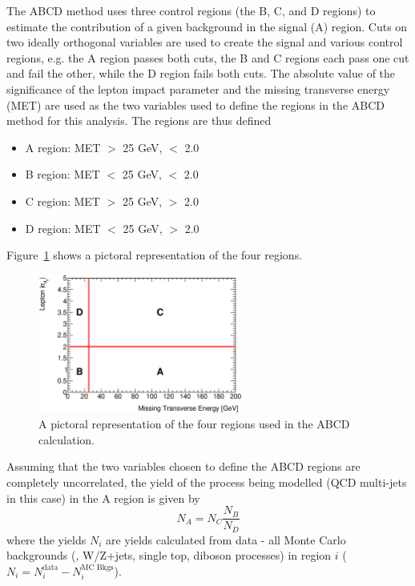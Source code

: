 The ABCD method uses three control regions (the B, C, and D regions) to estimate
the contribution of a given background in the signal (A) region. Cuts on two ideally
orthogonal variables are used to create the signal and various control regions, e.g. 
the A region passes both cuts, the B and C regions each pass one cut and fail the other, 
while the D region fails both cuts. The absolute value of the significance of the lepton 
impact parameter and the missing transverse energy (MET) are used as the two variables 
used to define the regions in the ABCD method for this analysis. The regions are thus 
defined 
\begin{itemize}
\item A region: MET $>$ 25 GeV, \dsig $<$ 2.0
\item B region: MET $<$ 25 GeV, \dsig $<$ 2.0
\item C region: MET $>$ 25 GeV, \dsig $>$ 2.0
\item D region: MET $<$ 25 GeV, \dsig $>$ 2.0
\end{itemize}
Figure~\ref{fig:abcdCartoon} shows a pictoral representation of the four regions.
\begin{figure}[h!]
\begin{center}
\includegraphics[width=0.6\textwidth]{figures/multijet/abcdExample_met_vs_d0sigBL20}
\end{center}
\caption{A pictoral representation of the four regions used in the
  ABCD calculation.} \label{fig:abcdCartoon}
\end{figure}
Assuming that the two variables chosen to define the ABCD regions are completely uncorrelated, the 
yield of the process being modelled (QCD multi-jets in this case) in the A region is given by
\begin{equation}
N_{A} = N_C \frac{N_B}{N_D}
\label{eq:simpleABCD}
\end{equation}
where the yields $N_i$ are yields calculated from data - all Monte Carlo backgrounds (\ttbar, 
W/Z+jets, single top, diboson processes) in region $i$ ($N_i = N_i^{\text{data}} - N_i^{\text{MC Bkgs}}$). 
